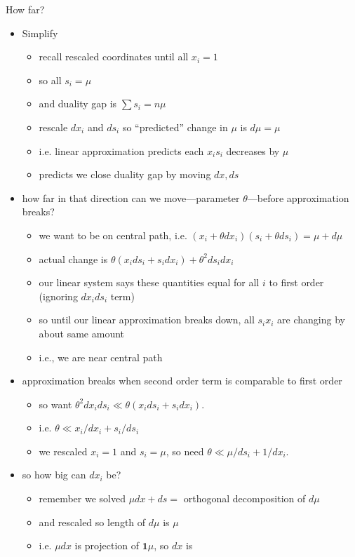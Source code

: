 \documentclass{article}
\begin{document}
How far?
\begin{itemize}
\item Simplify
\begin{itemize}
\item recall rescaled coordinates until all $x_i=1$
\item so all $s_i = \mu$
\item and duality gap is $\sum s_i = n\mu$
\item rescale $dx_i$ and $ds_i$ so ``predicted'' change in $\mu$ is $d\mu = \mu$
\item i.e. linear approximation predicts each $x_is_i$ decreases by $\mu$
\item predicts we close duality gap by moving $dx,ds$
\end{itemize}
\item how far in that direction can we move---parameter $\theta$---before approximation breaks?
\begin{itemize}
\item we want to be on central path, i.e. $(x_i+\theta dx_i)(s_i+\theta ds_i) = \mu+d\mu$
\item actual change is $\theta (x_ids_i + s_idx_i) +\theta^2 ds_idx_i$
\item our linear system says  these quantities equal for all $i$ to first order (ignoring $dx_ids_i$ term)
\item so until our linear approximation breaks down, all $s_ix_i$ are changing by about same amount
\item i.e., we are near central path
\end{itemize}
\item approximation breaks when second order term is comparable to first order
\begin{itemize}
\item so want $\theta^2dx_ids_i \ll \theta (x_ids_i + s_idx_i)$.
\item i.e. $\theta \ll x_i/dx_i + s_i/ds_i$
\item we rescaled $x_i=1$ and $s_i=\mu$, so need $\theta \ll \mu/ds_i +  1/dx_i$.
\end{itemize}
\item so how big can $dx_i$ be?
\begin{itemize}
\item remember we solved $\mu dx + ds =$ orthogonal decomposition of $d\mu$
\item and rescaled so length of $d\mu$ is $\mu$
\item i.e. $\mu dx$ is projection of $\mathbf{1}\mu$, so $dx$ is

\end{itemize}
\end{itemize}
\end{document}
